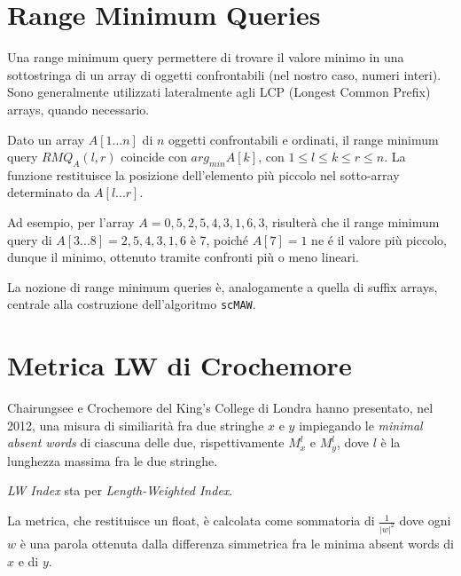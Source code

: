 \section{Range Minimum Queries}

Una range minimum query \cite{RMQ} permettere di trovare il valore minimo in una sottostringa di un array di oggetti confrontabili (nel nostro caso, numeri interi). Sono generalmente utilizzati lateralmente agli LCP (Longest Common Prefix) arrays, quando necessario.

\vspace{3mm}

Dato un array $A[1...n]$ di $n$ oggetti confrontabili e ordinati, il range minimum query $RMQ_A (l,r)$ coincide con $arg_{min} A[k]$, con $1\leq l\leq k \leq r \leq n$. La funzione restituisce la posizione dell'elemento più piccolo nel sotto-array determinato da $A[l...r]$. 

\vspace{3mm}

Ad esempio, per l'array $A=0,5,2,5,4,3,1,6,3$, risulterà che il range minimum query di $A[3...8]=2,5,4,3,1,6$ è 7, poiché $A[7]=1$ ne é il valore più piccolo, dunque il minimo, ottenuto tramite confronti più o meno lineari.

\vspace{3mm}

La nozione di range minimum queries è, analogamente a quella di suffix arrays, centrale alla costruzione dell'algoritmo \verb|scMAW|.

\section{Metrica LW di Crochemore}

Chairungsee e Crochemore del King's College di Londra hanno presentato, nel 2012, una misura di similiarità fra due stringhe $x$ e $y$ impiegando le \textit{minimal absent words} \cite{CHAIRUNGSEE2012109} di ciascuna delle due, rispettivamente $M^l_x$ e $M^l_y$, dove $l$ è la lunghezza massima fra le due stringhe.

\vspace{3mm}

\textit{LW Index} sta per \textit{Length-Weighted Index}.

\vspace{3mm}

La metrica, che restituisce un float, è calcolata come sommatoria di $\frac{1}{|w|^2}$ dove ogni $w$ è una parola ottenuta dalla differenza simmetrica fra le minima absent words di $x$ e di $y$.

